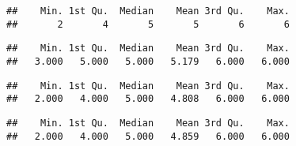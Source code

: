 \documentclass[]{article}
\newenvironment{Shaded}{\begin{snugshade}}{\end{snugshade}}
\newcommand{\KeywordTok}[1]{\textcolor[rgb]{0.13,0.29,0.53}{\textbf{#1}}}
\newcommand{\DecValTok}[1]{\textcolor[rgb]{0.00,0.00,0.81}{#1}}
\newcommand{\OperatorTok}[1]{\textcolor[rgb]{0.81,0.36,0.00}{\textbf{#1}}}
\newcommand{\NormalTok}[1]{#1}
\begin{document}
\begin{Shaded}
\end{Shaded}

\begin{verbatim}
##    Min. 1st Qu.  Median    Mean 3rd Qu.    Max. 
##       2       4       5       5       6       6
\end{verbatim}

\begin{Shaded}
\end{Shaded}

\begin{verbatim}
##    Min. 1st Qu.  Median    Mean 3rd Qu.    Max. 
##   3.000   5.000   5.000   5.179   6.000   6.000
\end{verbatim}

\begin{Shaded}
\end{Shaded}

\begin{verbatim}
##    Min. 1st Qu.  Median    Mean 3rd Qu.    Max. 
##   2.000   4.000   5.000   4.808   6.000   6.000
\end{verbatim}

\begin{Shaded}
\end{Shaded}

\begin{verbatim}
##    Min. 1st Qu.  Median    Mean 3rd Qu.    Max. 
##   2.000   4.000   5.000   4.859   6.000   6.000
\end{verbatim}

\begin{Shaded}
\end{Shaded}
\end{document}
